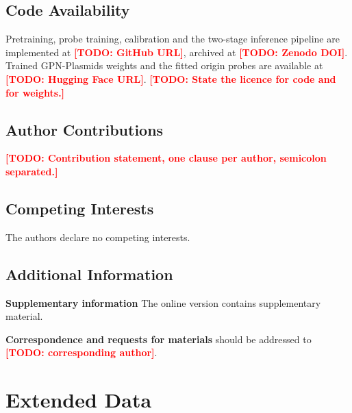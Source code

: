 \documentclass[11pt]{article}
\theoremstyle{plain}
\newcommand{\beginextendeddata}{%
        \renewcommand{\tablename}{Extended Data Table}
        \setcounter{table}{0}
        \renewcommand{\thetable}{\arabic{table}}%
        \renewcommand{\figurename}{Extended Data Figure}
        \setcounter{figure}{0}
        \renewcommand{\thefigure}{\arabic{figure}}%
     }
\newcommand{\model}{GPN-Plasmids\xspace}   %
\def\todo#1{\textbf{\textcolor{red}{ [TODO: #1]}}}
\newif\ifshowauthors
\begin{document}
\subsection*{Code Availability}
Pretraining, probe training, calibration and the two-stage inference pipeline
are implemented at \todo{GitHub URL}, archived at \todo{Zenodo DOI}. Trained
\model weights and the fitted origin probes are available at
\todo{Hugging Face URL}. \todo{State the licence for code and for weights.}

\subsection*{Author Contributions}
\todo{Contribution statement, one clause per author, semicolon separated.}

\subsection*{Competing Interests}
The authors declare no competing interests.

\subsection*{Additional Information}

\noindent
\textbf{Supplementary information} The online version contains supplementary material.

\noindent
\textbf{Correspondence and requests for materials} should be addressed to \todo{corresponding author}.


\clearpage

\section*{Extended Data}
\end{document}
